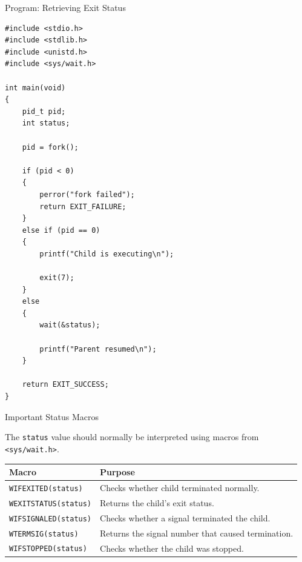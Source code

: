 \documentclass[aspectratio=169]{beamer}
\begin{document}
\begin{frame}[fragile]{Program: Retrieving Exit Status}

\begin{lstlisting}[style=cstyle]
#include <stdio.h>
#include <stdlib.h>
#include <unistd.h>
#include <sys/wait.h>

int main(void)
{
    pid_t pid;
    int status;

    pid = fork();

    if (pid < 0)
    {
        perror("fork failed");
        return EXIT_FAILURE;
    }
    else if (pid == 0)
    {
        printf("Child is executing\n");

        exit(7);
    }
    else
    {
        wait(&status);

        printf("Parent resumed\n");
    }

    return EXIT_SUCCESS;
}
\end{lstlisting}

\end{frame}

\begin{frame}{Important Status Macros}

The \texttt{status} value should normally be interpreted using macros from
\texttt{<sys/wait.h>}.

\begin{center}
\begin{tabular}{|p{4cm}|p{7cm}|}
\hline
\textbf{Macro} & \textbf{Purpose} \\
\hline

\texttt{WIFEXITED(status)}
&
Checks whether child terminated normally.
\\
\hline

\texttt{WEXITSTATUS(status)}
&
Returns the child's exit status.
\\
\hline

\texttt{WIFSIGNALED(status)}
&
Checks whether a signal terminated the child.
\\
\hline

\texttt{WTERMSIG(status)}
&
Returns the signal number that caused termination.
\\
\hline

\texttt{WIFSTOPPED(status)}
&
Checks whether the child was stopped.
\\
\hline

\end{tabular}
\end{center}

\end{frame}
\end{document}
